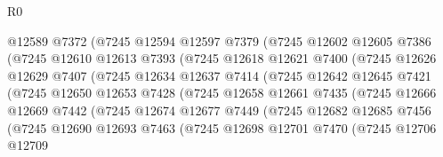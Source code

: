 \begin{lexlean}{R0}
\begin{coremodule}
                      @12589
                      @7372
                      (@7245
                        @12594
                        @12597
                        @7379
                        (@7245
                          @12602
                          @12605
                          @7386
                          (@7245
                            @12610
                            @12613
                            @7393
                            (@7245
                              @12618
                              @12621
                              @7400
                              (@7245
                                @12626
                                @12629
                                @7407
                                (@7245
                                  @12634
                                  @12637
                                  @7414
                                  (@7245
                                    @12642
                                    @12645
                                    @7421
                                    (@7245
                                      @12650
                                      @12653
                                      @7428
                                      (@7245
                                        @12658
                                        @12661
                                        @7435
                                        (@7245
                                          @12666
                                          @12669
                                          @7442
                                          (@7245
                                            @12674
                                            @12677
                                            @7449
                                            (@7245
                                              @12682
                                              @12685
                                              @7456
                                              (@7245
                                                @12690
                                                @12693
                                                @7463
                                                (@7245
                                                  @12698
                                                  @12701
                                                  @7470
                                                  (@7245
                                                    @12706
                                                    @12709

\end{coremodule}
\end{lexlean}
